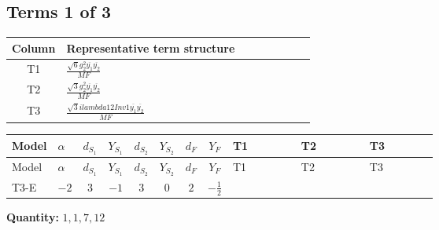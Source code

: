 \documentclass[8pt]{article}
\begin{document}
\begin{landscape}
\subsection*{Terms 1 of 3}
\begin{center}
\begin{tabular}{@{}c >{\raggedright\arraybackslash}p{0.82\linewidth}@{}}
\toprule
Column & Representative term structure \\
\midrule
T1 & \(\displaystyle \frac{\sqrt{6} g_{2}^{2} \overline{y_{1}} \overline{y_{2}}}{MF}\) \\
\midrule
T2 & \(\displaystyle \frac{\sqrt{3} g_{2}^{2} \overline{y_{1}} \overline{y_{2}}}{MF}\) \\
\midrule
T3 & \(\displaystyle \frac{\sqrt{3} i lambda12Inv1 \overline{y_{1}} \overline{y_{2}}}{MF}\) \\
\midrule
\bottomrule
\end{tabular}
\end{center}
\smallskip
\tiny
\begin{longtable}{@{}llcccccc >{\raggedright\arraybackslash}p{0.21\linewidth} >{\raggedright\arraybackslash}p{0.21\linewidth} >{\raggedright\arraybackslash}p{0.21\linewidth}@{}}
\toprule
Model & $\alpha$ & $d_{S_1}$ & $Y_{S_1}$ & $d_{S_2}$ & $Y_{S_2}$ & $d_F$ & $Y_F$ & T1 & T2 & T3 \\
\midrule
\endfirsthead
\toprule
Model & $\alpha$ & $d_{S_1}$ & $Y_{S_1}$ & $d_{S_2}$ & $Y_{S_2}$ & $d_F$ & $Y_F$ & T1 & T2 & T3 \\
\midrule
\endhead
T3-E & $-2$ & $3$ & $-1$ & $3$ & $0$ & $2$ & $-\frac{1}{2}$ & \scriptsize\adjustbox{max width=\linewidth}{$\begin{gathered} - \frac{\sqrt{6} g_{2}^{2} \overline{y_{1}} \overline{y_{2}}}{3 MF}\end{gathered}$} & \scriptsize\adjustbox{max width=\linewidth}{$\begin{gathered} - \frac{\sqrt{3} g_{2}^{2} \overline{y_{1}} \overline{y_{2}}}{6 MF}\end{gathered}$} & \scriptsize\adjustbox{max width=\linewidth}{$\begin{gathered} - \frac{\sqrt{3} i lambda12Inv1 \overline{y_{1}} \overline{y_{2}}}{6 MF}\end{gathered}$} \\
\midrule
\bottomrule
\end{longtable}
\clearpage
\noindent\textbf{Quantity: }$\mathrm{1,1,7,12}$\par\smallskip

\end{landscape}
\end{document}
